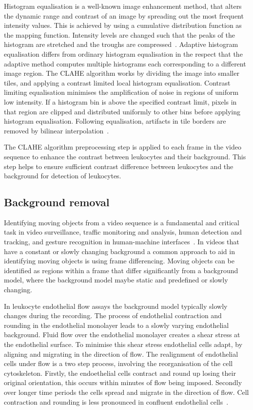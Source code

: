 Histogram equalisation is a well-known image enhancement method, that alters the dynamic range and contrast of an image by spreading out the most frequent intensity values. This is achieved by using a cumulative distribution function as the mapping function. Intensity levels are changed such that the peaks of the histogram are stretched and the troughs are compressed~\cite{Sasi2013}. Adaptive histogram equalisation differs from ordinary histogram equalisation in the respect that the adaptive method computes multiple histograms each corresponding to a different image region. The CLAHE algorithm works by dividing the image into smaller tiles, and applying a contrast limited local histogram equalisation. Contrast limiting equalisation minimises the amplification of noise in regions of uniform low intensity. If a histogram bin is above the specified contrast limit, pixels in that region are clipped and distributed uniformly to other bins before applying histogram equalisation. Following equalisation, artifacts in tile borders are removed by bilinear interpolation~\cite{Hummel1977}.

The CLAHE algorithm preprocessing step is applied to each frame in the video sequence to enhance the contrast between leukocytes and their background. This step helps to ensure sufficient contrast difference between leukocytes and the background for detection of leukocytes.

\subsection{Background removal}
\label{leukocytes:analysis:background}
Identifying moving objects from a video sequence is a fundamental and critical task in video surveillance, traffic monitoring and analysis, human detection and tracking, and gesture recognition in human-machine interfaces~\cite{Cheung2004}. In videos that have a constant or slowly changing background a common approach to aid in identifying moving objects is using frame differencing. Moving objects can be identified as regions within a frame that differ significantly from a background model, where the background model maybe static and predefined or slowly changing.

In leukocyte endothelial flow assays the background model typically slowly changes during the recording. The process of endothelial contraction and rounding in the endothelial monolayer leads to a slowly varying endothelial background. Fluid flow over the endothelial monolayer creates a shear stress at the endothelial surface. To minimise this shear stress endothelial cells adapt, by aligning and migrating in the direction of flow. The realignment of endothelial cells under flow is a two step process, involving the reorganisation of the cell cytoskeleton. Firstly, the endoethelial cells contract and round up losing their original orientation, this occurs within minutes of flow being imposed. Secondly over longer time periods the cells spread and migrate in the direction of flow. Cell contraction and rounding is less pronounced in confluent endothelial cells~\cite{Wells2011}.

